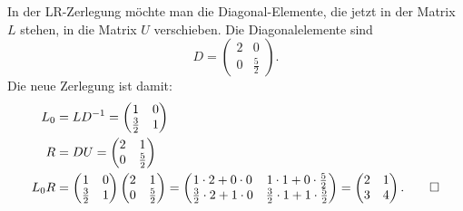 \begin{loesung}
In der LR-Zerlegung möchte man die Diagonal-Elemente, die jetzt in
der Matrix $L$ stehen, in die Matrix $U$ verschieben. Die Diagonalelemente
sind
\[
D=\begin{pmatrix}2&0\\0&\frac52\end{pmatrix}.
\]
Die neue Zerlegung ist damit:
\begin{align*}
L_0&=LD^{-1}=
\begin{pmatrix}
1&0\\
\frac32&1
\end{pmatrix}
\\
R&=DU=
\begin{pmatrix}
2&1\\
0&\frac52
\end{pmatrix}
\\
L_0R&=
\begin{pmatrix}
1&0\\
\frac32&1
\end{pmatrix}
\begin{pmatrix}
2&1\\
0&\frac52
\end{pmatrix}
=\begin{pmatrix}
1\cdot 2+0\cdot 0 & 1 \cdot 1+0\cdot \frac52\\
\frac32\cdot 2+1\cdot 0&\frac32\cdot 1+1\cdot\frac52
\end{pmatrix}
=
\begin{pmatrix}
2&1\\3&4
\end{pmatrix}.
\qedhere
\end{align*}
\end{loesung}


